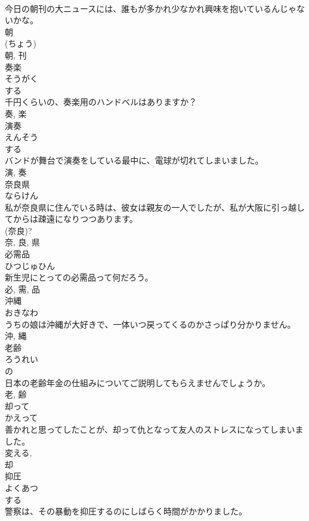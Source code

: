 \documentclass[8pt]{extreport}
\begin{document}
\begin{CJK}{UTF8}{min}
\\	今日の朝刊の大ニュースには、誰もが多かれ少なかれ興味を抱いているんじゃないかな。	
\\	朝 
\\	(ちょう) 
\\	朝, 刊	
\\	奏楽	
\\	そうがく	
\\	する 
\\	千円くらいの、奏楽用のハンドベルはありますか？	
\\	奏, 楽	
\\	演奏	
\\	えんそう	
\\	する 
\\	バンドが舞台で演奏をしている最中に、電球が切れてしまいました。	
\\	演, 奏	
\\	奈良県	
\\	ならけん	
\\	私が奈良県に住んでいる時は、彼女は親友の一人でしたが、私が大阪に引っ越してからは疎遠になりつつあります。	
\\	(奈良)? 
\\	奈, 良, 県	
\\	必需品	
\\	ひつじゅひん	
\\	新生児にとっての必需品って何だろう。	
\\	必, 需, 品	
\\	沖縄	
\\	おきなわ	
\\	うちの娘は沖縄が大好きで、一体いつ戻ってくるのかさっぱり分かりません。	
\\	沖, 縄	
\\	老齢	
\\	ろうれい	
\\	の 
\\	日本の老齢年金の仕組みについてご説明してもらえませんでしょうか。	
\\	老, 齢	
\\	却って	
\\	かえって	
\\	善かれと思ってしたことが、却って仇となって友人のストレスになってしまいました。	
\\	変える, 
\\	却	
\\	抑圧	
\\	よくあつ	
\\	する 
\\	警察は、その暴動を抑圧するのにしばらく時間がかかりました。	

\end{CJK}
\end{document}
